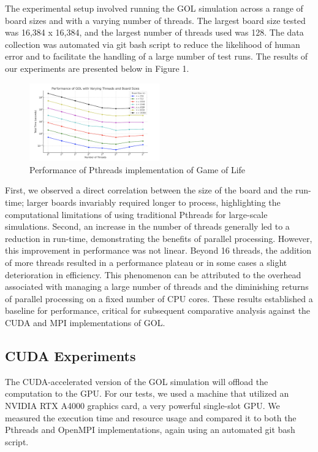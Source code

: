 \documentclass[11pt,twocolumn]{article}
\begin{document}
The experimental setup involved running the GOL simulation across a range of board sizes and with a varying number of threads. The largest board size tested was 16,384 x 16,384, and the largest number of threads used was 128. The data collection was automated via git bash script to reduce the likelihood of human error and to facilitate the handling of a large number of test runs. The results of our experiments are presented below in Figure 1.

\begin{figure}[!htbp]
    \centering
    \includegraphics[width=0.5\textwidth]{pthreads.png}
    \caption{Performance of Pthreads implementation of Game of Life}
    \label{fig:pthreads}
\end{figure}

First, we observed a direct correlation between the size of the board and the run-time; larger boards invariably required longer to process, highlighting the computational limitations of using traditional Pthreads for large-scale simulations. Second, an increase in the number of threads generally led to a reduction in run-time, demonstrating the benefits of parallel processing. However, this improvement in performance was not linear. Beyond 16 threads, the addition of more threads resulted in a performance plateau or in some cases a slight deterioration in efficiency. This phenomenon can be attributed to the overhead associated with managing a large number of threads and the diminishing returns of parallel processing on a fixed number of CPU cores. These results established a baseline for performance, critical for subsequent comparative analysis against the CUDA and MPI implementations of GOL.

\subsection{CUDA Experiments}

The CUDA-accelerated version of the GOL simulation will offload the computation to the GPU. For our tests, we used a machine that utilized an NVIDIA RTX A4000 graphics card, a very powerful single-slot GPU. We measured the execution time and resource usage and compared it to both the Pthreads and OpenMPI implementations, again using an automated git bash script. 
\end{document}
